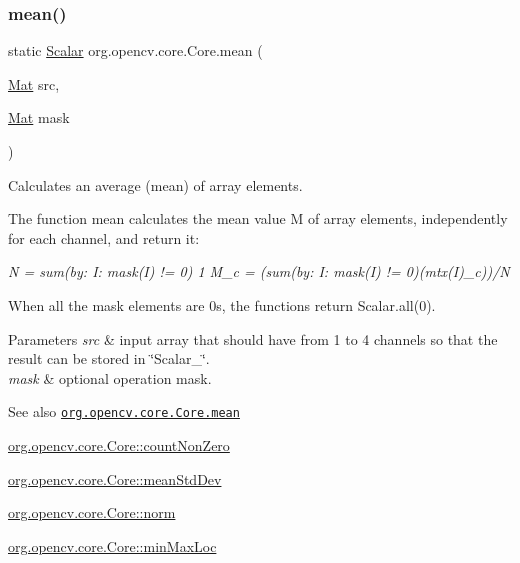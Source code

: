 \subsubsection{\texorpdfstring{mean()}{mean()}\hspace{0.1cm}{\footnotesize\ttfamily [1/2]}}
{\footnotesize\ttfamily static \mbox{\hyperlink{classorg_1_1opencv_1_1core_1_1_scalar}{Scalar}} org.\+opencv.\+core.\+Core.\+mean (\begin{DoxyParamCaption}\item[{\mbox{\hyperlink{classorg_1_1opencv_1_1core_1_1_mat}{Mat}}}]{src,  }\item[{\mbox{\hyperlink{classorg_1_1opencv_1_1core_1_1_mat}{Mat}}}]{mask }\end{DoxyParamCaption})\hspace{0.3cm}{\ttfamily [static]}}

Calculates an average (mean) of array elements.

The function {\ttfamily mean} calculates the mean value {\ttfamily M} of array elements, independently for each channel, and return it\+:

{\itshape N = sum(by\+: I\+: mask(\+I) != 0) 1 M\+\_\+c = (sum(by\+: I\+: mask(\+I) != 0)(mtx(\+I)\+\_\+c))/N }

When all the mask elements are 0\textquotesingle{}s, the functions return {\ttfamily Scalar.\+all(0)}.


\begin{DoxyParams}{Parameters}
{\em src} & input array that should have from 1 to 4 channels so that the result can be stored in \char`\"{}\+Scalar\+\_\+\char`\"{}. \\
\hline
{\em mask} & optional operation mask.\\
\hline
\end{DoxyParams}
\begin{DoxySeeAlso}{See also}
\href{http://docs.opencv.org/modules/core/doc/operations_on_arrays.html#mean}{\tt org.\+opencv.\+core.\+Core.\+mean} 

\mbox{\hyperlink{classorg_1_1opencv_1_1core_1_1_core_a216308f36e765f82c521087fe283e045}{org.\+opencv.\+core.\+Core\+::count\+Non\+Zero}} 

\mbox{\hyperlink{classorg_1_1opencv_1_1core_1_1_core_af8d7fbb33c11fbf6115d4c242dbbb5b3}{org.\+opencv.\+core.\+Core\+::mean\+Std\+Dev}} 

\mbox{\hyperlink{classorg_1_1opencv_1_1core_1_1_core_a282aac8c7806f10f75738bf8db3af7a8}{org.\+opencv.\+core.\+Core\+::norm}} 

\mbox{\hyperlink{classorg_1_1opencv_1_1core_1_1_core_a87987114238d2094a01395f12d6a9367}{org.\+opencv.\+core.\+Core\+::min\+Max\+Loc}} 
\end{DoxySeeAlso}
\mbox{\label{classorg_1_1opencv_1_1core_1_1_core_a25ced9c1cf960900fbed712b13235dbd}} 
